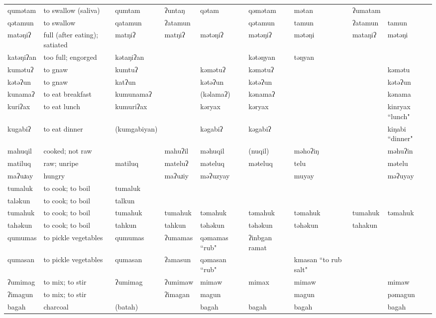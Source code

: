 \begin{landscape}
\begin{longtable}{*{9}{p{}}}
\text{*}qumətam & to swallow (saliva) & qumtam & ʔuntaŋ & qətam & qəmətam & mətan & ʔumatam & \\
\text{*}qətamun & to swallow & qatamun & ʔatamun &  & qətamun & tamun & ʔatamun & tamun\\
\text{*}matəŋiʔ & full (after eating); satiated & matŋiʔ & matŋiʔ & mətəŋiʔ & mətəŋiʔ & mətəŋi & mataŋiʔ & mətəŋi\\
\text{*}katəŋiʔan & too full; engorged & kətaŋiʔan &  &  & kətəŋyan & təŋyan &  & \\
\text{*}kumətuʔ & to gnaw & kumtuʔ &  & kəmətuʔ & kəmətuʔ &  &  & kəmətu\\
\text{*}kətəʔun & to gnaw & katʔun &  & kətəʔun & kətəʔun &  &  & kətəʔun\\
\text{*}kunamaʔ & to eat breakfast & kumunamaʔ &  & (kəlamaʔ) & kənamaʔ &  &  & kənama\\
\text{*}kuriʔax & to eat lunch & kumuriʔax &  & kəryax & kəryax &  &  & kinryax ``lunch"\\
\text{*}kugabiʔ & to eat dinner & (kumgabiyan) &  & kəgabiʔ & kəgabiʔ &  &  & kiŋabi ``dinner"\\
\text{*}mahuqil & cooked; not raw &  & mahuʔil & məhuqil & (nuqil) & məhoʔiŋ &  & məhuʔin\\
\text{*}matiluq & raw; unripe & matiluq & mateluʔ & məteluq & məteluq & telu &  & mətelu\\
\text{*}maʔuɹay & hungry &  & maʔuɹiy & məʔuzyay &  & muyay &  & məʔuyay\\
\text{*}tumaluk & to cook; to boil & tumaluk &  &  &  &  &  & \\
\text{*}taləkun & to cook; to boil & talkun &  &  &  &  &  & \\
\text{*}tumahuk & to cook; to boil & tumahuk & tumahuk & təmahuk & təmahuk & təmahuk & tumahuk & təmahuk\\
\text{*}tahəkun & to cook; to boil & tahkun & tahkun & təhəkun & təhəkun & təhəkun & tahakun & \\
\text{*}qumumas & to pickle vegetables & qumumas & ʔumamas & qəmamas ``rub" & ʔinbgan ramat &  &  & \\
\text{*}qumasan & to pickle vegetables & qumasan & ʔamasun & qəmasan ``rub" &  & kmasan ``to rub salt" &  & \\
\text{*}ʔumimag & to mix; to stir & ʔumimag & ʔumimaw & mimaw & mimax & mimaw &  & mimaw\\
\text{*}ʔimagun & to mix; to stir &  & ʔimagan & magun &  & magun &  & pəmagun\\
\text{*}bagah & charcoal & (batah) &  & bagah & bagah & bagah &  & bagah\\

\end{longtable}
\end{landscape}
